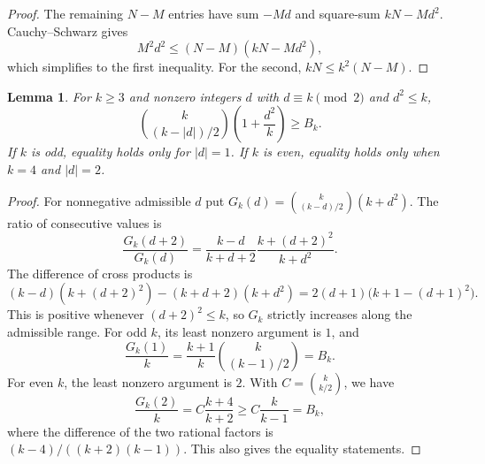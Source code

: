 \documentclass[11pt]{article}
\newtheorem{lemma}[theorem]{Lemma}
\theoremstyle{remark}
\numberwithin{equation}{section}
\begin{document}
\begin{proof}
The remaining $N-M$ entries have sum $-Md$ and square-sum $kN-Md^2$.
Cauchy--Schwarz gives
\[
 M^2d^2\le(N-M)(kN-Md^2),
\]
which simplifies to the first inequality.
For the second, $kN\le k^2(N-M)$.
\end{proof}

\begin{lemma}\label{lem:binomial-shell}
For $k\ge3$ and nonzero integers $d$ with $d\equiv k\pmod2$ and $d^2\le k$,
\[
 \binom{k}{(k-|d|)/2}\left(1+\frac{d^2}{k}\right)\ge B_k.
\]
If $k$ is odd, equality holds only for $|d|=1$.
If $k$ is even, equality holds only when $k=4$ and $|d|=2$.
\end{lemma}

\begin{proof}
For nonnegative admissible $d$ put
$G_k(d)=\binom{k}{(k-d)/2}(k+d^2)$.
The ratio of consecutive values is
\[
 \frac{G_k(d+2)}{G_k(d)}
 =\frac{k-d}{k+d+2}\frac{k+(d+2)^2}{k+d^2}.
\]
The difference of cross products is
\[
 (k-d)(k+(d+2)^2)-(k+d+2)(k+d^2)
 =2(d+1)\bigl(k+1-(d+1)^2\bigr).
\]
This is positive whenever $(d+2)^2\le k$, so $G_k$ strictly increases along
the admissible range.
For odd $k$, its least nonzero argument is $1$, and
\[
 \frac{G_k(1)}k
 =\frac{k+1}{k}\binom{k}{(k-1)/2}=B_k.
\]
For even $k$, the least nonzero argument is $2$.  With
$C=\binom{k}{k/2}$, we have
\[
 \frac{G_k(2)}k=C\frac{k+4}{k+2}
 \ge C\frac{k}{k-1}=B_k,
\]
where the difference of the two rational factors is
$(k-4)/((k+2)(k-1))$.
This also gives the equality statements.
\end{proof}
\end{document}
